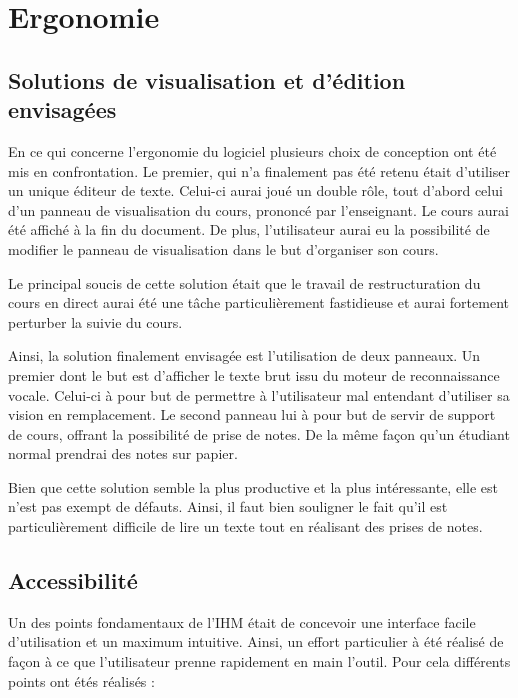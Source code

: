\section{Ergonomie}

\subsection{Solutions de visualisation et d'édition envisagées}

En ce qui concerne l'ergonomie du logiciel plusieurs choix de conception ont été mis en confrontation. Le premier, qui n'a finalement pas été retenu était d'utiliser un unique éditeur de texte. Celui-ci aurai joué un  double rôle, tout d'abord celui d'un panneau de visualisation du cours, prononcé par l'enseignant. Le cours aurai été affiché à la fin du document. De plus, l'utilisateur aurai eu la possibilité de modifier le panneau de visualisation dans le but d'organiser son  cours.

Le principal soucis de cette solution était que le travail de restructuration du cours en direct aurai été une tâche particulièrement fastidieuse et aurai fortement perturber la suivie du cours.

Ainsi, la solution finalement envisagée est l'utilisation de deux panneaux. Un premier dont le but est d'afficher le texte brut issu du moteur de reconnaissance vocale. Celui-ci à pour but de permettre à l'utilisateur mal entendant d'utiliser sa  vision en remplacement. Le second panneau lui à pour but de servir de support de cours, offrant la possibilité de prise de notes. De la même façon qu'un étudiant normal prendrai des notes sur papier.

Bien que cette solution semble la plus productive et la plus intéressante, elle est n'est pas exempt de défauts. Ainsi, il faut bien souligner le fait qu'il est particulièrement difficile de lire un texte tout en réalisant des  prises de notes.     



\subsection{Accessibilité}

Un des points fondamentaux de l'IHM était de concevoir une interface facile d'utilisation et un maximum intuitive. Ainsi, un effort particulier à été réalisé de façon à ce que l'utilisateur prenne rapidement en main l'outil. Pour cela différents points ont étés réalisés :


